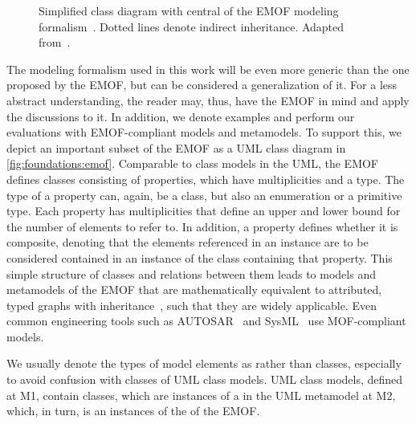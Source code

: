 \begin{figure}
    \centering
    
    \caption[Relevant subset of \acrshort{EMOF} modeling formalism]{Simplified class diagram with central \metaclasses of the \gls{EMOF} modeling formalism~\cite[p.~27]{mof}. Dotted lines denote indirect inheritance. Adapted from~\cite[Fig.~2.2]{kramer2017a}.}
    \label{fig:foundations:emof}
\end{figure}

The modeling formalism used in this work will be even more generic than the one proposed by the \gls{EMOF}, but can be considered a generalization of it.
For a less abstract understanding, the reader may, thus, have the \gls{EMOF} in mind and apply the discussions to it.
In addition, we denote examples and perform our evaluations with \gls{EMOF}-compliant models and metamodels.
To support this, we depict an important subset of the \gls{EMOF} \metametamodel as a \gls{UML} class diagram in \autoref{fig:foundations:emof}.
Comparable to class models in the \gls{UML}, the \gls{EMOF} defines classes consisting of properties, which have multiplicities and a type.
The type of a property can, again, be a class, but also an enumeration or a primitive type.
Each property has multiplicities that define an upper and lower bound for the number of elements to refer to.
In addition, a property defines whether it is composite, denoting that the elements referenced in an instance are to be considered contained in an instance of the class containing that property.
This simple structure of classes and relations between them leads to models and metamodels of the \gls{EMOF} that are mathematically equivalent to attributed, typed graphs with inheritance~\cite[Sec.~2.1.3.1]{kramer2017a}, such that they are widely applicable.
Even common engineering tools such as AUTOSAR~\cite{scheid2015autosar} and SysML~\cite{sysml} use \gls{MOF}-compliant models.

We usually denote the types of model elements as \emph{\metaclasses} rather than classes, especially to avoid confusion with classes of \gls{UML} class models.
\gls{UML} class models, defined at M1, contain classes, which are instances of a  \metaclass in the \gls{UML} metamodel at M2, which, in turn, is an instances of the  \metaclass of the \gls{EMOF}.


